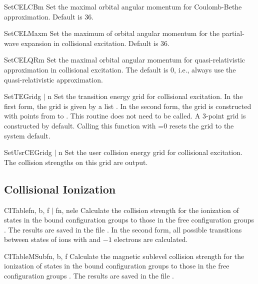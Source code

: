 \begin{fundesc}{SetCELCB}{m}
Set the maximal orbital angular momentum for Coulomb-Bethe approximation.
Default is 36.
\end{fundesc}

\begin{fundesc}{SetCELMax}{m}
Set the maximum of orbital angular momentum for the partial-wave expansion in
collisional excitation. Default is 36.
\end{fundesc}

\begin{fundesc}{SetCELQR}{m}
Set the maximal orbital angular momentum for quasi-relativistic approximation
in collisional excitation. The default is 0, i.e., always use the
quasi-relativistic approximation.
\end{fundesc}

\begin{fundesc}{SetTEGrid}{g $\mid$ n}
Set the transition energy grid for collisional excitation. In the first form,
the grid is given by a list . In the second form, the grid is constructed
with  points from   to . This routine does not need to be
called. A 3-point grid is constructed by default. Calling this function with
=0 resets the grid to the system default.
\end{fundesc}

\begin{fundesc}{SetUsrCEGrid}{g $\mid$ n}
Set the user collision energy grid for collisional excitation. The collision
strengths on this grid are output.
\end{fundesc}



\subsection{Collisional Ionization}

\begin{fundesc}{CITable}{fn, b, f $\mid$ fn, nele}
Calculate the collision strength for the ionization of states in the bound
configuration groups  to those in the free configuration groups .
The results are saved in the file . In the second form, all possible
transitions between states of ions with  and $-1$ electrons
are calculated.

\end{fundesc}

\begin{fundesc}{CITableMSub}{fn, b, f}
Calculate the magnetic sublevel collision strength for the ionization of
states in the bound configuration groups  to those in the free
configuration groups . The results are saved in the file .
\end{fundesc}

